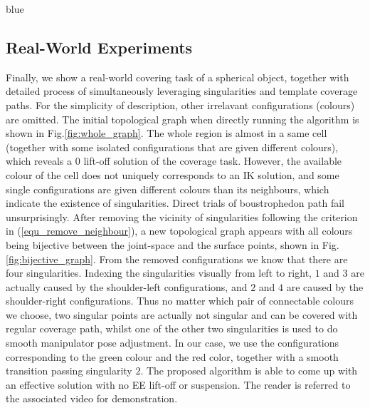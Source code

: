 \documentclass[Afour,sageh,times]{sagej}
\begin{document}
\begin{color}{blue}
\subsection{Real-World Experiments}\label{subsection_realworld}
\end{color}

Finally, we show a real-world covering task of a spherical object, together with detailed process of simultaneously leveraging singularities and template coverage paths. For the simplicity of description, other irrelavant configurations (colours) are omitted. The initial topological graph when directly running the algorithm is shown in Fig.\ref{fig:whole_graph}. The whole region is almost in a same cell (together with some isolated configurations that are given different colours), which reveals a $0$ lift-off solution of the coverage task. However, the available colour of the cell does not uniquely corresponds to an IK solution, and some single configurations are given different colours than its neighbours, which indicate the existence of singularities. Direct trials of boustrophedon path fail unsurprisingly. 
After removing the vicinity of singularities following the criterion in (\ref{equ_remove_neighbour}), a new topological graph appears with all colours being bijective between the joint-space and the surface points, shown in Fig.\ref{fig:bijective_graph}. From the removed configurations we know that there are four singularities. Indexing the singularities visually from left to right, $1$ and $3$ are actually caused by the shoulder-left configurations, and $2$ and $4$ are caused by the shoulder-right configurations. Thus no matter which pair of connectable colours we choose, two singular points are actually not singular and can be covered with regular coverage path, whilst one of the other two singularities is used to do smooth manipulator pose adjustment. 
In our case, we use the configurations corresponding to the green colour and the red color, together with a smooth transition passing singularity $2$. The proposed algorithm is able to come up with an effective solution with no EE lift-off or suspension. The reader is referred to the associated video for demonstration. 
\end{document}
